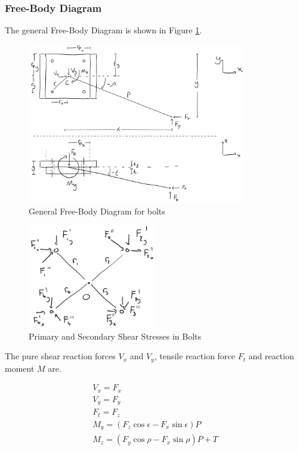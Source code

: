 \subsubsection{Free-Body Diagram}

The general Free-Body Diagram is shown in Figure \ref{fig:bolt_fbd_general}.

\begin{figure}
    \centering
    \includegraphics[width=0.85\textwidth]{4_Analysis/img/Bolts/BoltsFBDGeneral.png}
    \caption{General Free-Body Diagram for bolts}
    \label{fig:bolt_fbd_general}
\end{figure}{}

\begin{figure}
    \centering
    \includegraphics[width=0.5\textwidth]{4_Analysis/img/Bolts/BoltsHipShearStress.png}
    \caption{Primary and Secondary Shear Stresses in Bolts}
    \label{fig:bolt_stress}
\end{figure}

The pure shear reaction forces $V_x$ and $V_y$, tensile reaction force $F_t$ and reaction moment $M$ are.

\begin{gather}
    V_x = F_x \label{eq:bolt_reaction_shear_x}
    \\
    V_y = F_y \label{eq:bolt_reaction_shear_y}
    \\
    F_t = F_z \label{eq:bolt_reaction_shear_z}
    \\
    M_y = (F_z \cos{\epsilon} - F_x \sin{\epsilon})P \label{eq:bolt_reaction_moment_y}
    \\
    M_z = (F_y \cos{\rho} - F_x \sin{\rho}) P + T \label{eq:bolt_reaction_moment_z}
\end{gather}

